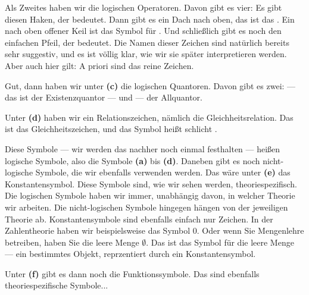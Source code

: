 \begin{spoken-clean}[00:28:38 - 00:31:29]
Als Zweites haben wir die logischen Operatoren.  Davon gibt es vier: Es gibt diesen Haken, der  bedeutet. Dann gibt es ein Dach nach oben, das ist das . Ein nach oben offener Keil ist das Symbol für . Und schließlich gibt es noch den einfachen Pfeil, der  bedeutet. Die Namen dieser Zeichen sind natürlich bereits sehr suggestiv, und es ist völlig klar, wie wir sie später interpretieren werden. Aber auch hier gilt: A priori sind das reine Zeichen.

Gut, dann haben wir unter \textbf{(c)} die logischen Quantoren.  Davon gibt es zwei:  --- das ist der Existenzquantor --- und  --- der Allquantor.

Unter \textbf{(d)} haben wir ein Relationszeichen, nämlich die Gleichheitsrelation.  Das ist das Gleichheitszeichen, und das Symbol heißt schlicht .

Diese Symbole --- wir werden das nachher noch einmal festhalten --- heißen logische Symbole, also die Symbole \textbf{(a)} bis \textbf{(d)}. Daneben gibt es noch nicht-logische Symbole, die wir ebenfalls verwenden werden. Das wäre unter \textbf{(e)} das Konstantensymbol.  Diese Symbole sind, wie wir sehen werden, theoriespezifisch. Die logischen Symbole haben wir immer, unabhängig davon, in welcher Theorie wir arbeiten. Die nicht-logischen Symbole hingegen hängen von der jeweiligen Theorie ab. Konstantensymbole sind ebenfalls einfach nur Zeichen. In der Zahlentheorie haben wir beispielsweise das Symbol $0$. Oder wenn Sie Mengenlehre betreiben, haben Sie die leere Menge $\emptyset$. Das ist das Symbol für die leere Menge --- ein bestimmtes Objekt, reprzentiert durch ein Konstantensymbol.

Unter \textbf{(f)} gibt es dann noch die Funktionssymbole.  Das sind ebenfalls theoriespezifische Symbole...
\end{spoken-clean}

\begin{ai-global-state-checkpoint-invisible-content}
\end{ai-global-state-checkpoint-invisible-content}

